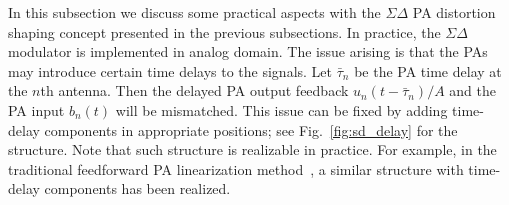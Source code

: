 \documentclass[10pt,twocolumn,twoside]{IEEEtran}
\begin{document}
In this subsection we discuss some practical aspects with the $\Sigma \Delta$ PA distortion shaping concept presented in the previous subsections.
In practice, the $\Sigma \Delta$ modulator is implemented in analog domain.
The issue arising is that the PAs may introduce certain time delays to the signals.
Let $\bar \tau_n$ be the PA time delay at the $n$th antenna.
Then the delayed PA output feedback
$u_n(t-\bar \tau_n)/A$
and the PA input $b_n(t)$ will be mismatched.
This issue can be fixed by adding time-delay components in appropriate positions;
see Fig.~\ref{fig:sd_delay} for the structure.
Note that such structure is realizable in practice.
For example, in the traditional feedforward PA linearization method~\cite{cripps2006rf}, a similar structure with time-delay components has been realized.
\end{document}
